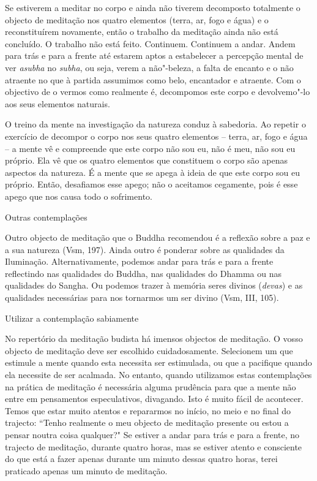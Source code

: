 Se estiverem a meditar no corpo e ainda não tiverem decomposto
totalmente o objecto de meditação nos quatro elementos (terra, ar, fogo e
água) e o reconstituírem novamente, então o trabalho da meditação ainda
não está concluído. O trabalho não está feito. Continuem. Continuem a
andar. Andem para trás e para a frente até estarem aptos a estabelecer a
percepção mental de ver \emph{asubha} no \emph{subha}, ou seja, verem a
não"-beleza, a falta de encanto e o não atraente no que à partida
assumimos como belo, encantador e atraente. Com o objectivo de o vermos
como realmente é, decompomos este corpo e devolvemo"-lo aos seus
elementos naturais.

O treino da mente na investigação da natureza conduz à sabedoria. Ao
repetir o exercício de decompor o corpo nos seus quatro elementos --
terra, ar, fogo e água -- a mente vê e compreende que este corpo não sou
eu, não é meu, não sou eu próprio. Ela vê que os quatro elementos que
constituem o corpo são apenas aspectos da natureza. É a mente que se
apega à ideia de que este corpo sou eu próprio. Então, desafiamos esse
apego; não o aceitamos cegamente, pois é esse apego que nos causa todo o
sofrimento.

\begin{siderule-quote}
  Outras contemplações
\end{siderule-quote}

Outro objecto de meditação que o Buddha recomendou é a reflexão
sobre a paz e a sua natureza (Vsm, 197). Ainda outro é ponderar sobre as
qualidades da Iluminação. Alternativamente, podemos andar para trás e
para a frente reflectindo nas qualidades do Buddha, nas qualidades
do Dhamma ou nas qualidades do Sangha. Ou podemos trazer à
memória seres divinos (\emph{devas}) e as qualidades necessárias para
nos tornarmos um ser divino (Vsm, III, 105).

\begin{siderule-quote}
  Utilizar a contemplação sabiamente
\end{siderule-quote}

No repertório da meditação budista há imensos objectos de meditação. O
vosso objecto de meditação deve ser escolhido cuidadosamente. Selecionem
um que estimule a mente quando esta necessita ser estimulada, ou que a
pacifique quando ela necessite de ser acalmada. No entanto, quando
utilizamos estas contemplações na prática de meditação é necessária
alguma prudência para que a mente não entre em pensamentos
especulativos, divagando. Isto é muito fácil de acontecer. Temos que
estar muito atentos e repararmos no início, no meio e no final do
trajecto: ``Tenho realmente o meu objecto de meditação presente ou estou a
pensar noutra coisa qualquer?" Se estiver a andar para trás e para a
frente, no trajecto de meditação, durante quatro horas, mas se estiver
atento e consciente do que está a fazer apenas durante um minuto dessas
quatro horas, terei praticado apenas um minuto de meditação.

